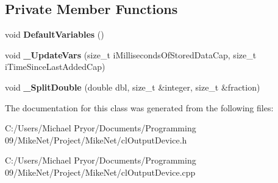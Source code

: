 \subsection*{Private Member Functions}
\begin{DoxyCompactItemize}
\item 
\hypertarget{classcl_output_device_a7007951e03bd7e976cbf6bfd713eb447}{
void {\bfseries DefaultVariables} ()}
\label{classcl_output_device_a7007951e03bd7e976cbf6bfd713eb447}

\item 
\hypertarget{classcl_output_device_ae8e84978b2fa4a1cb37834a55f3fafa0}{
void {\bfseries \_\-UpdateVars} (size\_\-t iMillisecondsOfStoredDataCap, size\_\-t iTimeSinceLastAddedCap)}
\label{classcl_output_device_ae8e84978b2fa4a1cb37834a55f3fafa0}

\item 
\hypertarget{classcl_output_device_a6b22817451f9d324310d79cea877d4df}{
void {\bfseries \_\-SplitDouble} (double dbl, size\_\-t \&integer, size\_\-t \&fraction)}
\label{classcl_output_device_a6b22817451f9d324310d79cea877d4df}

\end{DoxyCompactItemize}


The documentation for this class was generated from the following files:\begin{DoxyCompactItemize}
\item 
C:/Users/Michael Pryor/Documents/Programming 09/MikeNet/Project/MikeNet/clOutputDevice.h\item 
C:/Users/Michael Pryor/Documents/Programming 09/MikeNet/Project/MikeNet/clOutputDevice.cpp\end{DoxyCompactItemize}
